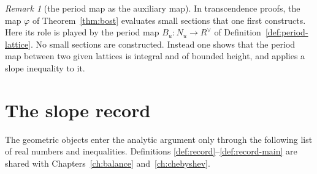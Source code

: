 \documentclass[11pt]{amsbook}
\theoremstyle{plain}
\theoremstyle{definition}
\theoremstyle{remark}
\newtheorem{remark}[theorem]{Remark}
\numberwithin{equation}{section}
\numberwithin{figure}{chapter}
\numberwithin{table}{chapter}
\begin{document}
\begin{remark}[the period map as the auxiliary map]
\label{rem:periodmap}
In transcendence proofs, the map $\varphi$ of Theorem~\ref{thm:bost}
evaluates small sections that one first constructs. Here its role is
played by the period map $B_u\colon N_u\to R^\vee$ of
Definition~\ref{def:period-lattice}. No small sections are constructed.
Instead one shows that the period map between two given lattices is
integral and of bounded height, and applies a slope inequality to it.
\end{remark}

\section{The slope record}

The geometric objects enter the analytic argument only through the
following list of real numbers and inequalities. Definitions
\ref{def:record}--\ref{def:record-main} are shared with
Chapters~\ref{ch:balance} and~\ref{ch:chebyshev}.
\end{document}

